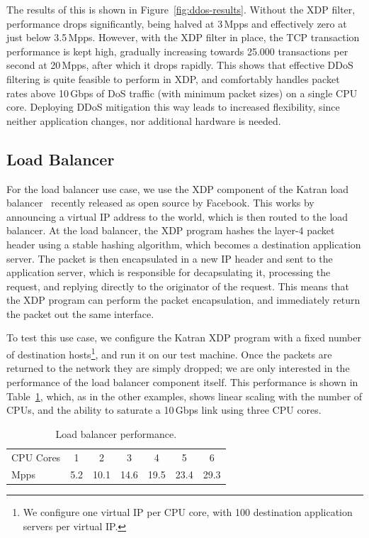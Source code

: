 \documentclass[10pt,sigconf,anonymous]{acmart}
\begin{document}
The results of this is shown in Figure~\ref{fig:ddos-results}. Without the XDP
filter, performance drops significantly, being halved at 3\,Mpps and effectively
zero at just below 3.5\,Mpps. However, with the XDP filter in place, the TCP
transaction performance is kept high, gradually increasing towards 25.000
transactions per second at 20\,Mpps, after which it drops rapidly. This shows
that effective DDoS filtering is quite feasible to perform in XDP, and
comfortably handles packet rates above 10\,Gbps of DoS traffic (with minimum
packet sizes) on a single CPU core. Deploying DDoS mitigation this way leads to
increased flexibility, since neither application changes, nor additional
hardware is needed.

\subsection{Load Balancer}
\label{sec:load-balancer}
For the load balancer use case, we use the XDP component of the Katran load
balancer~\cite{katran} recently released as open source by Facebook. This works
by announcing a virtual IP address to the world, which is then routed to the
load balancer. At the load balancer, the XDP program hashes the layer-4 packet
header using a stable hashing algorithm, which becomes a destination application
server. The packet is then encapsulated in a new IP header and sent to the
application server, which is responsible for decapsulating it, processing the
request, and replying directly to the originator of the request. This means that
the XDP program can perform the packet encapsulation, and immediately return the
packet out the same interface.

To test this use case, we configure the Katran XDP program with a fixed number
of destination hosts\footnote{We configure one virtual IP per CPU core, with 100
  destination application servers per virtual IP.}, and run it on our test
machine. Once the packets are returned to the network they are simply dropped;
we are only interested in the performance of the load balancer component itself.
This performance is shown in Table~\ref{tbl:load-balancer}, which, as in the
other examples, shows linear scaling with the number of CPUs, and the ability to
saturate a 10\,Gbps link using three CPU cores.

\begin{table}[htbp]
\caption{\label{tbl:load-balancer}Load balancer performance.}
\centering
\begin{tabular}{lcccccc}
  \toprule
  CPU Cores & 1   &  2  &  3  &  4  &  5  &  6  \\
  Mpps & 5.2 & 10.1 & 14.6 & 19.5 & 23.4 & 29.3 \\
\bottomrule
\end{tabular}
\end{table}
\end{document}
